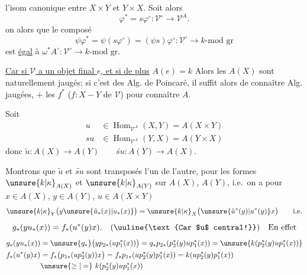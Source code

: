  l'isom canonique entre $X\times Y$ et $Y\times X$. Soit alors
\[
\varphi^*=s\varphi^\circ:\mathcal V^\circ\longrightarrow\mathcal V^A.
\]
on  alors que le composé
\[
\psi\varphi^*=\psi(s\varphi^\circ)=(\psi s)\varphi^\circ:\mathcal V^\circ\longrightarrow k\text{-mod gr}
\]
est  \uline{égal} à $\omega^*A^\circ:\mathcal V^\circ\longrightarrow k\text{-mod gr}$.


\uline{Car si $\mathcal V$ a un objet final $e$, et si de plus} $A(e)=k$  Alors les $A(X)$ sont naturellement jaugés; si c'est des Alg. de Poincaré, il suffit alors de connaître  Alg. jaugées, $+$ les $f^*$ ($f:X-Y$ de $\mathcal V$) pour connaître $A$.

Soit
\[
\begin{aligned}
u&\in\operatorname{Hom}_{\mathcal V^A}(X,Y)=A(X\times Y)\\
su&\in\operatorname{Hom}_{\mathcal V^A}(Y,X)=A(Y\times X)
\end{aligned}
\]
donc $\tilde u:A(X)\longrightarrow A(Y)\qquad\widetilde{su}:A(Y)\longrightarrow A(X)$.

Montrons que  $\tilde u$ et $\widetilde{su}$ sont transposés l'un de l'autre, pour les formes $\unsure{k|\kappa}_{A(X)}$ et $\unsure{k|\kappa}_{A(Y)}$ sur $A(X)$, $A(Y)$, i.e.\ on a pour $x\in A(X)$, $y\in A(Y)$, $u\in A(X\times Y)$
\[
\unsure{k|\kappa}_Y\bigl(y\unsure{\tilde u_*(x)|u_*(x)}\bigr)=\unsure{k|\kappa}_X\bigl(\unsure{\tilde u^*(y)|u^*(y)}x\bigr)\qquad\text{i.e.}
\]
\[
g_*(y u_*(x))=f_*(u^*(y)x).\quad(\uuline{\text{Car $u$ central!}})\quad\text{En effet}
\]
\[
\begin{aligned}
g_*(y u_*(x))
&=\unsure{g_*}\bigl(y p_{2*}(u p_1^*(x))\bigr)
=g_*p_{2*}(p_2^*(y)u p_1^*(x))
=\unsure{k(p_2^*(y)u p_1^*(x))}\\
f_*(u^*(y)x)
&=f_*\bigl(p_{1*}(u p_2^*(y))x\bigr)
=f_*p_{1*}(u p_2^*(y)p_1^*(x))
=k(u p_2^*(y)p_1^*(x))\\
&\unsure{\geq|=}\ k(p_2^*(y)u p_1^*(x))
\end{aligned}
\]
